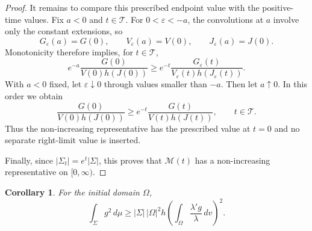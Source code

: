 \documentclass[11pt,reqno]{amsart}
\numberwithin{equation}{section}
\newtheorem{corollary}[theorem]{Corollary}
\theoremstyle{definition}
\begin{document}
\begin{proof}
It remains to compare this prescribed endpoint value with the
positive-time values. Fix $a<0$ and $t\in\mathcal T$. For $0<\varepsilon<-a$, the convolutions at $a$ involve only the constant extensions, so
\begin{equation*}
G_\varepsilon(a)=G(0),\qquad
V_\varepsilon(a)=V(0),\qquad
J_\varepsilon(a)=J(0).
\end{equation*}
Monotonicity therefore implies, for $t\in\mathcal T$,
\begin{equation*}
e^{-a}\frac{G(0)}{V(0)h(J(0))}
\geq
e^{-t}
\frac{G_\varepsilon(t)}
{V_\varepsilon(t)h(J_\varepsilon(t))}.
\end{equation*}
With $a<0$ fixed, let $\varepsilon\downarrow0$ through values smaller
than $-a$. Then let $a\uparrow0$. In this order we obtain
\begin{equation*}
    \frac{G(0)}{V(0)h(J(0))}
    \geq e^{-t}\frac{G(t)}{V(t)h(J(t))},
    \qquad t\in\mathcal T.
\end{equation*}
Thus the non-increasing representative has the prescribed value at
$t=0$ and no separate right-limit value is inserted.


Finally, since $|\Sigma_t|=e^t|\Sigma|$, this proves that $\mathcal M(t)$ has a non-increasing representative on $[0,\infty)$.
\end{proof}


\begin{corollary}\label{cor:hyp-g2-lower}
For the initial domain $\Omega$,
\begin{equation}\label{eq:hyp-g2-lower}
    \int_\Sigma g^2\,d\mu
    \geq
    |\Sigma|\,|\Omega|^2h\left(\int_\Omega \frac{\lambda'g}{\lambda}\,dv\right)^2.
\end{equation}
\end{corollary}
\end{document}
